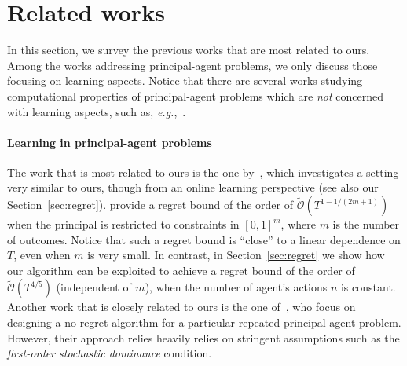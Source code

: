 \section{Related works}\label{sec:related}

In this section, we survey the previous works that are most related to ours.
%
Among the works addressing principal-agent problems, we only discuss those focusing on learning aspects.
%
Notice that there are several works studying computational properties of principal-agent problems  which are \emph{not} concerned with learning aspects, such as, \emph{e.g.},~\citep{dutting2019simple,alon2021contracts,guruganesh2021contracts,dutting2021complexity,dutting2022combinatorial,castiglioni2022bayesian,castiglioni2022designing}.


\paragraph{Learning in principal-agent problems}
%
The work that is most related to ours is the one by~\citet{zhu2022sample}, which investigates a setting very similar to ours, though from an online learning perspective (see also our Section~\ref{sec:regret}).
%
%
\citet{zhu2022sample} provide a regret bound of the order of $\widetilde {\mathcal{O}}(T^{1 - 1/(2m+1)})$ when the principal is restricted to constraints in $[0,1]^m$, where $m$ is the number of outcomes.
%
Notice that such a regret bound is ``close'' to a linear dependence on $T$, even when $m$ is very small.
%
In contrast, in Section~\ref{sec:regret} we show how our algorithm can be exploited to achieve a regret bound of the order of $\widetilde{\mathcal{O}}(T^{4/5})$ (independent of $m$), when the number of agent's actions $n$ is constant.
%
%
Another work that is closely related to ours is the one of~\citet{ho2015adaptive}, who focus on designing a no-regret algorithm for a particular repeated principal-agent problem.
%
However, their approach relies heavily relies on stringent assumptions such as the \emph{first-order stochastic dominance} condition.
%


